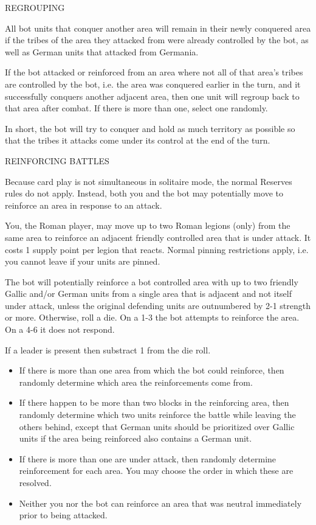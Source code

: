\label{solitaire:regrouping}REGROUPING

All bot units that conquer another area will remain in their newly conquered area if the tribes of the area they attacked from were already controlled by the bot, as well as German units that attacked from Germania.
    
If the bot attacked or reinforced from an area where not all of that area's tribes are controlled by the bot, i.e. the area was conquered earlier in the turn, and it successfully conquers another adjacent area, then one unit will regroup back to that area after combat. If there is more than one, select one randomly.
    
In short, the bot will try to conquer and hold as much territory as possible so that the tribes it attacks come under its control at the end of the turn.
  
\label{solitaire:reinforcing_battles}REINFORCING BATTLES
  
Because card play is not simultaneous in solitaire mode, the normal Reserves rules do not apply. Instead, both you and the bot may potentially move to reinforce an area in response to an attack.
  
You, the Roman player, may move up to two Roman legions (only) from the same area to reinforce an adjacent friendly controlled area that is under attack. It costs 1 supply point per legion that reacts. Normal pinning restrictions apply, i.e. you cannot leave if your units are pinned.
    
The bot will potentially reinforce a bot controlled area with up to two friendly Gallic and/or German units from a single area that is adjacent and not itself under attack, unless the original defending units are outnumbered by 2-1 strength or more. Otherwise, roll a die. On a 1-3 the bot attempts to reinforce the area. On a 4-6 it does not respond.

If a leader is present then substract 1 from the die roll.

\begin{itemize}
  \item If there is more than one area from which the bot could reinforce, then randomly determine which area the reinforcements come from.
    
  \item If there happen to be more than two blocks in the reinforcing area, then randomly determine which two units reinforce the battle while leaving the others behind, except that German units should be prioritized over Gallic units if the area being reinforced also contains a German unit.
    
  \item If there is more than one are under attack, then randomly determine reinforcement for each area. You may choose the order in which these are resolved.
    
  \item Neither you nor the bot can reinforce an area that was neutral immediately prior to being attacked.
\end{itemize}
  
